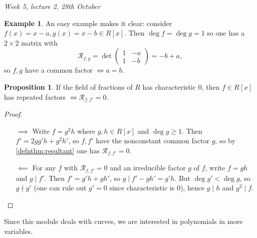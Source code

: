 \documentclass{article}
\newcommand{\re}{\mathcal{R}}
\theoremstyle{definition}
\newtheorem{prop}[defn]{Proposition}
\newtheorem{example}[defn]{Example}
\begin{document}
\begin{flushright}
\textit{Week 5, lecture 2, 28th October}
\end{flushright}

\begin{example}
An easy example makes it clear: consider $f(x)=x-a,g(x)=x-b\in R[x]$. Then $\deg f=\deg g=1$ so one has a $2\times 2$ matrix with
\[
\re_{f,g}=\det\begin{pmatrix}
1 & -a \\ 1 & -b
\end{pmatrix}=-b+a,
\]
so $f,g$ have a common factor $\iff a=b$.
\end{example}

\begin{prop}
\label{prop:resultant}
If the field of fractions of $R$ has characteristic 0, then $f\in R[x]$ has repeated factors $\iff\re_{f,f'}=0$.
\end{prop}
\begin{proof}
\begin{itemize}
\item[$\implies$] Write $f=g^2h$ where $g,h\in R[x]$ and $\deg g\geq 1$. Then $f'=2gg'h+g^2h'$, so $f,f'$ have the nonconstant common factor $g$, so by \ref{defnthm:resultant} one has $\re_{f,f'}=0$.
\item[$\impliedby$] For any $f$ with $\re_{f,f'}=0$ and an irreducible factor $g$ of $f$, write $f=gh$ and $g\mid f'$. Then $f'=g'h+gh'$, so $g\mid f'-gh'=g'h$. But $\deg g'<\deg g$, so $g\nmid g'$ (one can rule out $g'=0$ since characteristic is 0), hence $g\mid h$ and $g^2\mid f$.
\end{itemize}
\end{proof}

Since this module deals with curves, we are interested in polynomials in more variables.
\end{document}
